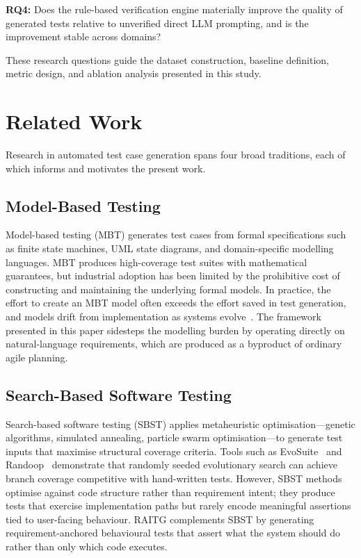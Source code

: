 \documentclass[11pt,letterpaper]{article}
\begin{document}
\textbf{RQ4:} Does the rule-based verification engine materially improve the quality of generated tests relative to unverified direct LLM prompting, and is the improvement stable across domains?

These research questions guide the dataset construction, baseline definition, metric design, and ablation analysis presented in this study.

\section{Related Work}
\label{sec:related_work}

Research in automated test case generation spans four broad traditions, each of which informs and motivates the present work.

\subsection{Model-Based Testing}

Model-based testing (MBT) generates test cases from formal specifications such as finite state machines, UML state diagrams, and domain-specific modelling languages. MBT produces high-coverage test suites with mathematical guarantees, but industrial adoption has been limited by the prohibitive cost of constructing and maintaining the underlying formal models. In practice, the effort to create an MBT model often exceeds the effort saved in test generation, and models drift from implementation as systems evolve~\cite{utting2012}. The framework presented in this paper sidesteps the modelling burden by operating directly on natural-language requirements, which are produced as a byproduct of ordinary agile planning.

\subsection{Search-Based Software Testing}

Search-based software testing (SBST) applies metaheuristic optimisation---genetic algorithms, simulated annealing, particle swarm optimisation---to generate test inputs that maximise structural coverage criteria. Tools such as EvoSuite~\cite{evosuite2011} and Randoop~\cite{randoop2007} demonstrate that randomly seeded evolutionary search can achieve branch coverage competitive with hand-written tests. However, SBST methods optimise against code structure rather than requirement intent; they produce tests that exercise implementation paths but rarely encode meaningful assertions tied to user-facing behaviour. RAITG complements SBST by generating requirement-anchored behavioural tests that assert what the system should do rather than only which code executes.
\end{document}
